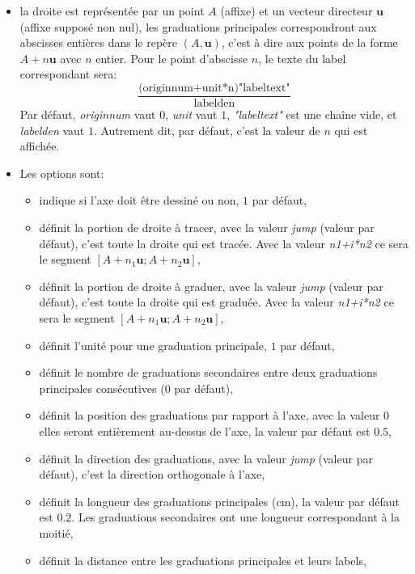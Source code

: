 \begin{itemize}
 \item\desc la droite est représentée par un point $A$ (affixe) et un vecteur directeur $\mathbf{u}$ (affixe supposé non nul), les graduations principales correspondront aux abscisses entières dans le repère $(A,\mathbf{u})$, c'est à dire aux points de la forme $A+n\mathbf{u}$ avec $n$ entier. Pour le point d'abscisse $n$, le texte du label correspondant sera: 
\[\dfrac{\text{(originnum+unit*n)"labeltext"}}{\text{labelden}}\]
Par défaut, \emph{originnum} vaut $0$, \emph{unit} vaut $1$, \emph{"labeltext"} est une chaîne vide, et \emph{labelden} vaut $1$. Autrement dit, par défaut, c'est la valeur de $n$ qui est affichée.
 \item Les options sont:
  \begin{itemize}
  \item {} indique si l'axe doit être dessiné ou non, $1$ par défaut,
  \item {} définit la portion de droite à tracer, avec la valeur \emph{jump} (valeur par défaut), c'est toute la droite qui est tracée. Avec la valeur \emph{n1+i*n2} ce sera le segment $[A+n_1\mathbf{u};A+n_2\mathbf{u}]$,
  \item {} définit la portion de droite à graduer, avec la valeur \emph{jump} (valeur par défaut), c'est toute la droite qui est graduée. Avec la valeur \emph{n1+i*n2} ce sera le segment $[A+n_1\mathbf{u};A+n_2\mathbf{u}]$,
  \item {} définit l'unité pour une graduation principale, $1$ par défaut,
  \item {} définit le nombre de graduations secondaires entre deux graduations principales consécutives (0 par défaut),
  \item {} définit la position des graduations par rapport à l'axe, avec la valeur $0$ elles seront entièrement au-dessus de l'axe, la valeur par défaut est $0.5$,
  \item {} définit la direction des graduations, avec la valeur \emph{jump} (valeur par défaut), c'est la direction orthogonale à l'axe,
  \item {} définit la longueur des graduations principales (cm), la valeur par défaut est $0.2$. Les graduations secondaires ont une longueur correspondant à la moitié,
  \item {} définit la distance entre les graduations principales et leurs labels,

\end{itemize}
\end{itemize}
